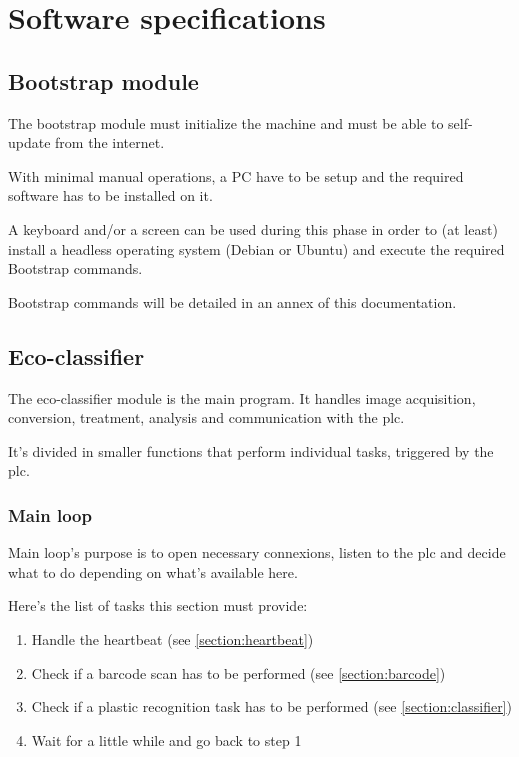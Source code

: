 \chapter{Software specifications}
\label{chapter:softwarereqs}

\section{Bootstrap module}

The bootstrap module must initialize the machine and must be able to self-update from the internet.

With minimal manual operations, a PC have to be setup and the required software has to be installed on it.

A keyboard and/or a screen can be used during this phase in order to (at least) install a headless operating
system (Debian or Ubuntu) and execute the required Bootstrap commands.

Bootstrap commands will be detailed in an annex of this documentation.


\section{Eco-classifier}

The eco-classifier module is the main program. It handles image acquisition, conversion, treatment, analysis
and communication with the \gls{plc}.

It's divided in smaller functions that perform individual tasks, triggered by the \gls{plc}.

\subsection{Main loop}

Main loop's purpose is to open necessary connexions, listen to the \gls{plc} and decide what to do depending on what's available here.

Here's the list of tasks this section must provide:

\begin{enumerate}
    \item Handle the \gls{heartbeat} (see \ref{section:heartbeat})
    \item Check if a barcode scan has to be performed (see \ref{section:barcode})
    \item Check if a plastic recognition task has to be performed (see \ref{section:classifier})
    \item Wait for a little while and go back to step 1
\end{enumerate}

